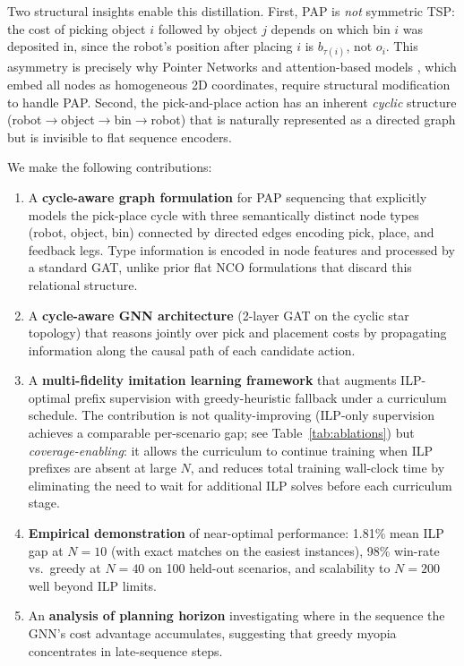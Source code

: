 \documentclass[conference]{IEEEtran}
\begin{document}
Two structural insights enable this distillation. First, PAP is \emph{not} symmetric TSP: the cost of picking object $i$ followed by object $j$ depends on which bin $i$ was deposited in, since the robot's position after placing $i$ is $b_{\tau(i)}$, not $o_i$. This asymmetry is precisely why Pointer Networks \cite{vinyals2015pointer} and attention-based models \cite{kool2019attention}, which embed all nodes as homogeneous 2D coordinates, require structural modification to handle PAP. Second, the pick-and-place action has an inherent \emph{cyclic} structure (robot$\to$object$\to$bin$\to$robot) that is naturally represented as a directed graph but is invisible to flat sequence encoders.

We make the following contributions:
\begin{enumerate}
    \item A \textbf{cycle-aware graph formulation} for PAP sequencing that explicitly models the pick-place cycle with three semantically distinct node types (robot, object, bin) connected by directed edges encoding pick, place, and feedback legs. Type information is encoded in node features and processed by a standard GAT, unlike prior flat NCO formulations that discard this relational structure.
    \item A \textbf{cycle-aware GNN architecture} (2-layer GAT on the cyclic star topology) that reasons jointly over pick and placement costs by propagating information along the causal path of each candidate action.
    \item A \textbf{multi-fidelity imitation learning framework} that augments ILP-optimal prefix supervision with greedy-heuristic fallback under a curriculum schedule. The contribution is not quality-improving (ILP-only supervision achieves a comparable per-scenario gap; see Table~\ref{tab:ablations}) but \emph{coverage-enabling}: it allows the curriculum to continue training when ILP prefixes are absent at large $N$, and reduces total training wall-clock time by eliminating the need to wait for additional ILP solves before each curriculum stage.
    \item \textbf{Empirical demonstration} of near-optimal performance: 1.81\% mean ILP gap at $N{=}10$ (with exact matches on the easiest instances), 98\% win-rate vs.\ greedy at $N{=}40$ on 100 held-out scenarios, and scalability to $N{=}200$ well beyond ILP limits.
    \item An \textbf{analysis of planning horizon} investigating where in the sequence the GNN's cost advantage accumulates, suggesting that greedy myopia concentrates in late-sequence steps.
\end{enumerate}
\end{document}
